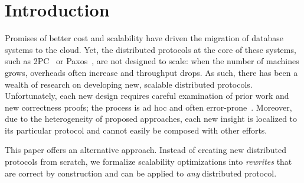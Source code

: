 \section{Introduction}
\label{sec:intro}


Promises of better cost and scalability have driven the migration of database systems to the cloud. 
Yet, the distributed protocols at the core of these systems, such as 2PC~\cite{mohan1986transaction} or Paxos~\cite{paxos}, are not designed to scale:
when the number of machines grows, overheads often increase and throughput drops.
As such, there has been a wealth of research on developing new, scalable distributed protocols.
Unfortunately, each new design requires careful examination of prior work and new correctness proofs; the process is ad hoc and often
error-prone~\cite{epaxos-broken,zyzzyvaBug, craqBug, raftBug, raftDissertation, protocolBugsList}.
Moreover, due to the heterogeneity
of proposed approaches, each new insight is localized to its particular protocol and cannot
easily be composed with other efforts.

This paper offers an alternative approach.
Instead of creating new distributed protocols from scratch, we formalize scalability optimizations into \textit{ rewrites} that are correct by construction 
and can be applied to \textit{any} distributed protocol.

